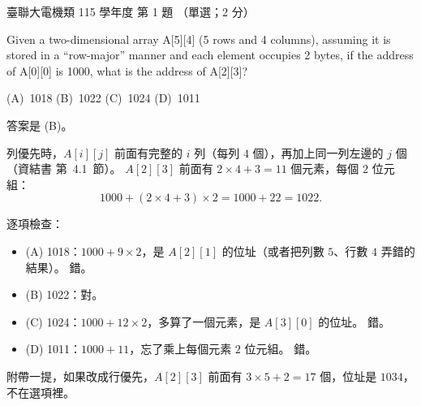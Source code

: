 \begin{pastexam}[label={px:ust-115-ee-ds-01}]{臺聯大電機類 115 學年度 第 1 題}
（單選；2 分）

Given a two-dimensional array A[5][4] (5 rows and 4 columns), assuming it is stored in a
``row-major'' manner and each element occupies 2 bytes, if the address of A[0][0] is 1000, what is
the address of A[2][3]?

(A)~1018 \qquad (B)~1022 \qquad (C)~1024 \qquad (D)~1011
\end{pastexam}

\begin{pastsoln}
答案是 (B)。

列優先時，$A[i][j]$ 前面有完整的 $i$ 列（每列 $4$ 個），再加上同一列左邊的 $j$ 個（資結書
第~4.1~節）。 $A[2][3]$ 前面有 $2 \times 4 + 3 = 11$ 個元素，每個 $2$ 位元組：
\[
1000 + (2 \times 4 + 3) \times 2 = 1000 + 22 = 1022 .
\]

逐項檢查：
\begin{itemize}
\item (A) 1018：$1000 + 9 \times 2$，是 $A[2][1]$ 的位址（或者把列數 $5$、行數 $4$ 弄錯的結果）。 錯。
\item (B) 1022：對。
\item (C) 1024：$1000 + 12 \times 2$，多算了一個元素，是 $A[3][0]$ 的位址。 錯。
\item (D) 1011：$1000 + 11$，忘了乘上每個元素 $2$ 位元組。 錯。
\end{itemize}
附帶一提，如果改成行優先，$A[2][3]$ 前面有 $3 \times 5 + 2 = 17$ 個，位址是 $1034$，不在選項裡。
\end{pastsoln}
